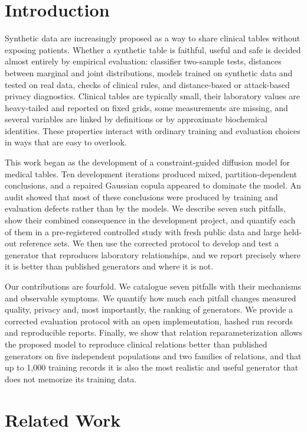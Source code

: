 \documentclass[conference]{IEEEtran}
\begin{document}
\section{Introduction}

Synthetic data are increasingly proposed as a way to share clinical tables without exposing patients. Whether a synthetic table is faithful, useful and safe is decided almost entirely by empirical evaluation: classifier two-sample tests, distances between marginal and joint distributions, models trained on synthetic data and tested on real data, checks of clinical rules, and distance-based or attack-based privacy diagnostics. Clinical tables are typically small, their laboratory values are heavy-tailed and reported on fixed grids, some measurements are missing, and several variables are linked by definitions or by approximate biochemical identities. These properties interact with ordinary training and evaluation choices in ways that are easy to overlook.

This work began as the development of a constraint-guided diffusion model for medical tables. Ten development iterations produced mixed, partition-dependent conclusions, and a repaired Gaussian copula appeared to dominate the model. An audit showed that most of these conclusions were produced by training and evaluation defects rather than by the models. We describe seven such pitfalls, show their combined consequence in the development project, and quantify each of them in a pre-registered controlled study with fresh public data and large held-out reference sets. We then use the corrected protocol to develop and test a generator that reproduces laboratory relationships, and we report precisely where it is better than published generators and where it is not.

Our contributions are fourfold. We catalogue seven pitfalls with their mechanisms and observable symptoms. We quantify how much each pitfall changes measured quality, privacy and, most importantly, the ranking of generators. We provide a corrected evaluation protocol with an open implementation, hashed run records and reproducible reports. Finally, we show that relation reparameterization allows the proposed model to reproduce clinical relations better than published generators on five independent populations and two families of relations, and that up to 1,000 training records it is also the most realistic and useful generator that does not memorize its training data.

\section{Related Work}
\end{document}
